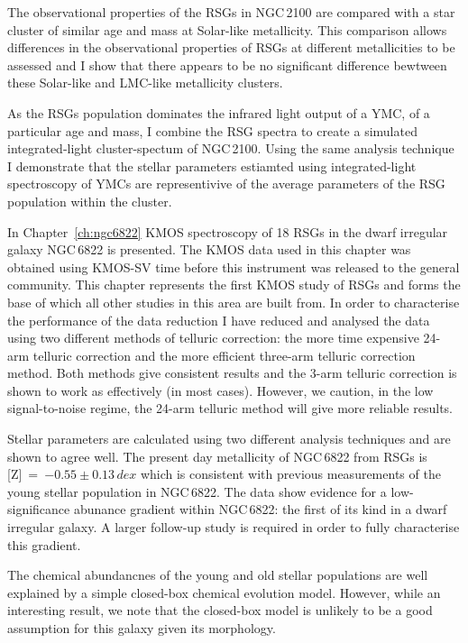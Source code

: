 The observational properties of the RSGs in NGC\,2100 are compared with a star cluster of similar age and mass at Solar-like metallicity.
This comparison allows differences in the observational properties of RSGs at different metallicities to be assessed and I show that there appears to be no significant difference bewtween these Solar-like and LMC-like metallicity clusters.

As the RSGs population dominates the infrared light output of a YMC, of a particular age and mass, I combine the RSG spectra to create a simulated integrated-light cluster-spectum of NGC\,2100.
Using the same analysis technique I demonstrate that the stellar parameters estiamted using integrated-light spectroscopy of YMCs are representivive of the average parameters of the RSG population within the cluster.

In Chapter~\ref{ch:ngc6822} KMOS spectroscopy of 18 RSGs in the dwarf irregular galaxy NGC\,6822 is presented.
The KMOS data used in this chapter was obtained using KMOS-SV time before this instrument was released to the general community.
This chapter represents the first KMOS study of RSGs and forms the base of which all other studies in this area are built from.
In order to characterise the performance of the data reduction I have reduced and analysed the data using two different methods of telluric correction: the more time expensive 24-arm telluric correction and the more efficient three-arm telluric correction method.
Both methods give consistent results and the 3-arm telluric correction is shown to work as effectively (in most cases).
However, we caution, in the low signal-to-noise regime, the 24-arm telluric method will give more reliable results.

Stellar parameters are calculated using two different analysis techniques and are shown to agree well.
The present day metallicity of NGC\,6822 from RSGs is
[Z]~=~$-0.55\pm0.13\,dex$ which is consistent with previous measurements of the young stellar population in NGC\,6822.
The data show evidence for a low-significance abunance gradient within NGC\,6822: the first of its kind in a dwarf irregular galaxy.
A larger follow-up study is required in order to fully characterise this gradient.

The chemical abundancnes of the young and old stellar populations are well explained by a simple closed-box chemical evolution model.
However, while an interesting result, we note that the closed-box model is unlikely to be a good assumption for this galaxy given its morphology.

